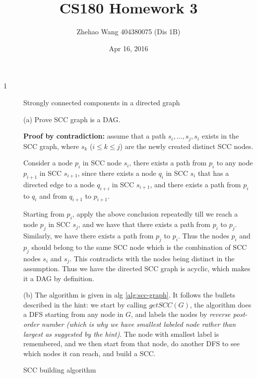 \documentclass{article}
\title{CS180 Homework 3}
\author{Zhehao Wang 404380075 (Dis 1B)}
\date{Apr 16, 2016}
\begin{document}
\maketitle

\begin{description}

\item[1]{Strongly connected components in a directed graph}
  
  (a) Prove SCC graph is a DAG.

  \textbf{Proof by contradiction:} assume that a path $s_i, ..., s_j, s_i$ exists in the SCC graph, where $s_k$ ($i \leq k \leq j$) are the newly created distinct SCC nodes.

  Consider a node $p_i$ in SCC node $s_i$, there exists a path from $p_i$ to any node $p_{i+1}$ in SCC $s_{i+1}$, since there exists a node $q_i$ in SCC $s_i$ that has a directed edge to a node $q_{i+i}$ in SCC $s_{i+1}$, and there exists a path from $p_i$ to $q_i$ and from $q_{i+1}$ to $p_{i+1}$.

  Starting from $p_i$, apply the above conclusion repeatedly till we reach a node $p_j$ in SCC $s_j$, and we have that there exists a path from $p_i$ to $p_j$. Similarly, we have there exists a path from $p_j$ to $p_i$. Thus the nodes $p_i$ and $p_j$ should belong to the same SCC node which is the combination of SCC nodes $s_i$ and $s_j$. This contradicts with the nodes being distinct in the assumption. Thus we have the directed SCC graph is acyclic, which makes it a DAG by definition.

  (b) The algorithm is given in alg \ref{alg:scc-graph}. It follows the bullets described in the hint: we start by calling $getSCC(G)$, the algorithm does a DFS starting from any node in $G$, and labels the nodes by \textit{reverse post-order number (which is why we have smallest labeled node rather than largest as suggested by the hint)}. The node with smallest label is remembered, and we then start from that node, do another DFS to see which nodes it can reach, and build a SCC.


  \begin{algorithm}[h]
  \caption{SCC building algorithm}
  \label{alg:scc-graph}
    \begin{algorithmic}[1]
  

\end{algorithmic}
\end{algorithm}
\end{description}
\end{document}
